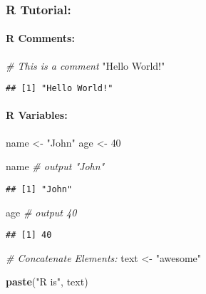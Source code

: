 \documentclass[
]{article}
\newenvironment{Shaded}{\begin{snugshade}}{\end{snugshade}}
\newcommand{\CommentTok}[1]{\textcolor[rgb]{0.56,0.35,0.01}{\textit{#1}}}
\newcommand{\DecValTok}[1]{\textcolor[rgb]{0.00,0.00,0.81}{#1}}
\newcommand{\FunctionTok}[1]{\textcolor[rgb]{0.13,0.29,0.53}{\textbf{#1}}}
\newcommand{\NormalTok}[1]{#1}
\newcommand{\OtherTok}[1]{\textcolor[rgb]{0.56,0.35,0.01}{#1}}
\newcommand{\StringTok}[1]{\textcolor[rgb]{0.31,0.60,0.02}{#1}}
\begin{document}
\hypertarget{r-tutorial}{%
\subsubsection{R Tutorial:}\label{r-tutorial}}

\hypertarget{r-comments}{%
\paragraph{R Comments:}\label{r-comments}}

\begin{Shaded}
\begin{Highlighting}[]
\CommentTok{\# This is a comment}
\StringTok{"Hello World!"}
\end{Highlighting}
\end{Shaded}

\begin{verbatim}
## [1] "Hello World!"
\end{verbatim}

\hypertarget{r-variables}{%
\paragraph{R Variables:}\label{r-variables}}

\begin{Shaded}
\begin{Highlighting}[]
\NormalTok{name }\OtherTok{\textless{}{-}} \StringTok{"John"}
\NormalTok{age }\OtherTok{\textless{}{-}} \DecValTok{40}

\NormalTok{name   }\CommentTok{\# output "John"}
\end{Highlighting}
\end{Shaded}

\begin{verbatim}
## [1] "John"
\end{verbatim}

\begin{Shaded}
\begin{Highlighting}[]
\NormalTok{age    }\CommentTok{\# output 40}
\end{Highlighting}
\end{Shaded}

\begin{verbatim}
## [1] 40
\end{verbatim}

\begin{Shaded}
\begin{Highlighting}[]
\CommentTok{\# Concatenate Elements:}
\NormalTok{text }\OtherTok{\textless{}{-}} \StringTok{"awesome"}

\FunctionTok{paste}\NormalTok{(}\StringTok{"R is"}\NormalTok{, text)}
\end{Highlighting}
\end{Shaded}
\end{document}
